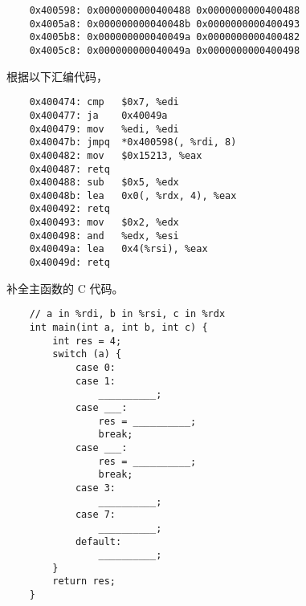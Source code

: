\begin{problems}
\begin{verbatim}
    0x400598: 0x0000000000400488 0x0000000000400488
    0x4005a8: 0x000000000040048b 0x0000000000400493
    0x4005b8: 0x000000000040049a 0x0000000000400482
    0x4005c8: 0x000000000040049a 0x0000000000400498
        \end{verbatim}
        根据以下汇编代码，
        \begin{verbatim}
    0x400474: cmp   $0x7, %edi
    0x400477: ja    0x40049a
    0x400479: mov   %edi, %edi
    0x40047b: jmpq  *0x400598(, %rdi, 8)
    0x400482: mov   $0x15213, %eax
    0x400487: retq
    0x400488: sub   $0x5, %edx
    0x40048b: lea   0x0(, %rdx, 4), %eax
    0x400492: retq
    0x400493: mov   $0x2, %edx
    0x400498: and   %edx, %esi
    0x40049a: lea   0x4(%rsi), %eax
    0x40049d: retq             
        \end{verbatim}
        补全主函数的 C 代码。
        \begin{verbatim}
    // a in %rdi, b in %rsi, c in %rdx
    int main(int a, int b, int c) {
        int res = 4;
        switch (a) {
            case 0:
            case 1:
                __________;
            case ___:
                res = __________;
                break;
            case ___:
                res = __________;
                break;
            case 3:
                __________;
            case 7:
                __________;
            default:
                __________;
        }
        return res;
    }
        \end{verbatim}
    \end{problems}

